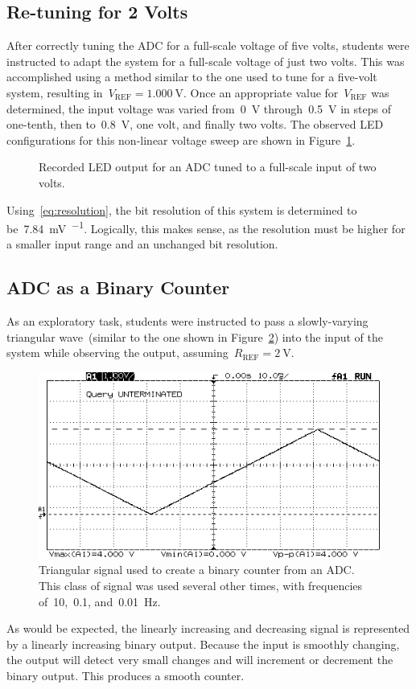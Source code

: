 \subsection{Re-tuning for 2 Volts}
After correctly tuning the ADC for a full-scale voltage of five volts, students were instructed to adapt the system for a full-scale voltage of just two volts.  This was accomplished using a method similar to the one used to tune for a five-volt system, resulting in~$V_\text{REF} = \SI{1.000}{\volt}$.  Once an appropriate value for~$V_\text{REF}$ was determined, the input voltage was varied from~\SI{0}{\volt} through~\SI{0.5}{\volt} in steps of one-tenth, then to~\SI{0.8}{\volt}, one volt, and finally two volts.  The observed LED configurations for this non-linear voltage sweep are shown in Figure~\ref{fig:pt6bars}.
%
\begin{figure}[H]
	\centering
	
	\parbox{.6\textwidth}{
	\caption[LED output for tuned ADC; $V_\text{FS} = \SI{2}{\volt}$]{Recorded LED output for an ADC tuned to a full-scale input of two volts.}
	\label{fig:pt6bars}}
\end{figure}
%
Using~\eqref{eq:resolution}, the bit resolution of this system is determined to be~\SI{7.84}{\milli\volt\per\bit}.  Logically, this makes sense, as the resolution must be higher for a smaller input range and an unchanged bit resolution.

\subsection{ADC as a Binary Counter}
As an exploratory task, students were instructed to pass a slowly-varying triangular wave~(similar to the one shown in Figure~\ref{fig:triangle}) into the input of the system while observing the output, assuming~$R_\text{REF} = \SI{2}{\volt}$.
%
\begin{figure}[H]
	\centering
	\includegraphics[width=.6\textwidth]{img/shot/part7shot.png}
	\parbox{.6\textwidth}{
	\caption[Example triangular signal]{Triangular signal used to create a binary counter from an ADC.  This class of signal was used several other times, with frequencies of~10,~0.1, and~\SI{0.01}{\hertz}.}
	\label{fig:triangle}}
\end{figure}
%
As would be expected, the linearly increasing and decreasing signal is represented by a linearly increasing binary output.  Because the input is smoothly changing, the output will detect very small changes and will increment or decrement the binary output.  This produces a smooth counter.
